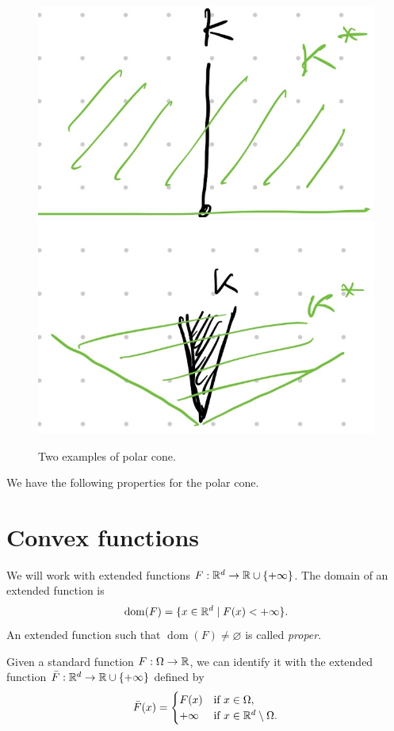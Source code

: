 \documentclass{report}
\begin{document}
	\begin{figure}[t]
		\centering
		\includegraphics[width=.3\textwidth]{images/polar-cone-1}
		\hspace{.1\textwidth}
		\includegraphics[width=.3\textwidth]{images/polar-cone-2}
		\caption{Two examples of polar cone.}
	\end{figure}

	We 	have the following properties for the polar cone.


	\section{Convex functions}

	We will work with extended functions $F:\mathbb{R}^d\to \mathbb{R}\cup\{+\infty\}$. The domain of an extended function is 
	\begin{equation}
		\operatorname{dom}(F) = \{x\in \mathbb{R}^d\mid F(x)<+\infty\}.
	\end{equation}
	An extended function such that $\operatorname{dom}(F)\neq \varnothing$ is called \emph{proper}.
	
	Given a standard function $F:\Omega\to \mathbb{R}$, we can identify it with the extended function $\bar F:\mathbb{R}^d\to \mathbb{R}\cup\{+\infty\}$ defined by
	\begin{equation}
		\bar F(x) = 
		\begin{cases}
			F(x) & \text{if }x\in \Omega,\\
			+\infty & \text{if }x\in \mathbb{R}^d\setminus \Omega.
		\end{cases}
	\end{equation}
\end{document}
